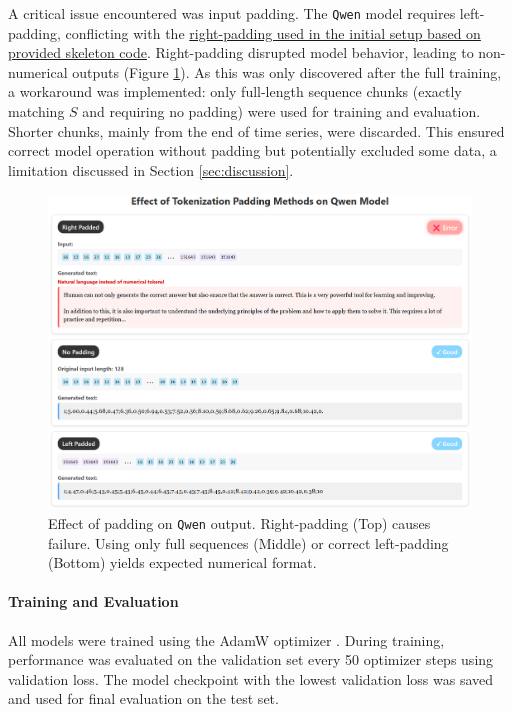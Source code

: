 \documentclass{article}
\begin{document}
A critical issue encountered was input padding. The \texttt{Qwen} model requires left-padding, conflicting with the \href{https://gitlab.developers.cam.ac.uk/phy/data-intensive-science-mphil/lecture-materials/m2_dl_for_dis/-/blob/main/coursework/lora_skeleton.py?ref_type=heads}{right-padding used in the initial setup based on provided skeleton code}. Right-padding disrupted model behavior, leading to non-numerical outputs (Figure \ref{fig:padding_effect}). As this was only discovered after the full training, a workaround was implemented: only full-length sequence chunks (exactly matching $S$ and requiring no padding) were used for training and evaluation. Shorter chunks, mainly from the end of time series, were discarded. This ensured correct model operation without padding but potentially excluded some data, a limitation discussed in Section \ref{sec:discussion}.

\begin{figure}[!htbp]
    \centering
    \includegraphics[width=0.9\linewidth]{M2 Course Work//Images/padding_effect.png}
    \caption{Effect of padding on \texttt{Qwen} output. Right-padding (Top) causes failure. Using only full sequences (Middle) or correct left-padding (Bottom) yields expected numerical format.} %
    \label{fig:padding_effect}
\end{figure}


\paragraph{Training and Evaluation}
All models were trained using the AdamW optimizer \cite{loshchilov2019decoupledweightdecayregularization}. During training, performance was evaluated on the validation set every 50 optimizer steps using validation loss. The model checkpoint with the lowest validation loss was saved and used for final evaluation on the test set.
\end{document}
